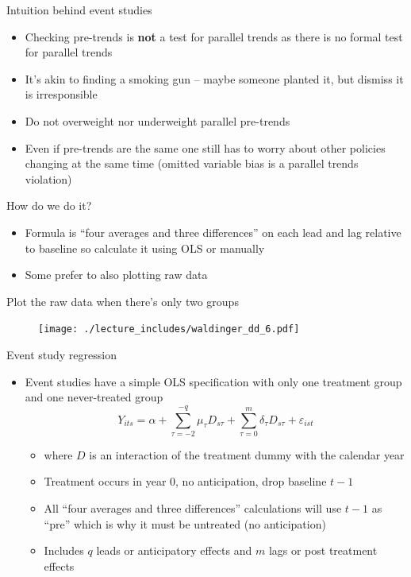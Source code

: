 \documentclass{beamer}
\begin{document}
\begin{frame}{Intuition behind event studies}
	
	\begin{itemize}
	\item Checking pre-trends is \textbf{not} a test for parallel trends as there is no formal test for parallel trends
	\item It's akin to finding a smoking gun -- maybe someone planted it, but dismiss it is irresponsible
	\item Do not overweight nor underweight parallel pre-trends
	\item Even if pre-trends are the same one still has to worry about other policies changing at the same time (omitted variable bias is a parallel trends violation)

\end{itemize}

\end{frame}


\begin{frame}{How do we do it?}

\begin{itemize}
\item Formula is ``four averages and three differences'' on each lead and lag relative to baseline so calculate it using OLS or manually
\item Some prefer to also plotting raw data
\end{itemize}

\end{frame}

\begin{frame}{Plot the raw data when there's only two groups}

	\begin{figure}
	\texttt{[image: ./lecture\_includes/waldinger\_dd\_6.pdf]}
	\end{figure}

\end{frame}




\begin{frame}{Event study regression}
	
	\begin{itemize}
	\item Event studies have a simple OLS specification with only one treatment group and one never-treated group $$Y_{its} = \alpha +  \sum_{\tau=-2}^{-q}\mu_{\tau}D_{s\tau} + \sum_{\tau=0}^m\delta_{\tau}D_{s\tau}+\varepsilon_{ist}$$
		\begin{itemize}
		\item where $D$ is an interaction of the treatment dummy with the calendar year 
		\item Treatment occurs in year 0, no anticipation, drop baseline $t-1$
		\item All ``four averages and three differences'' calculations will use $t-1$ as ``pre'' which is why it must be untreated (no anticipation)
		\item Includes $q$ leads or anticipatory effects and $m$ lags or post treatment effects
		\end{itemize}
	\end{itemize}
\end{frame}
\end{document}
